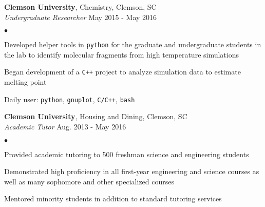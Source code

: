 \documentclass[margin, line]{res}
\newenvironment{list2}{
	\begin{list}{$\bullet$}{%
		\setlength{\itemsep}{0in}
		\setlength{\parsep}{0in} \setlength{\parskip}{0in}
		\setlength{\topsep}{0in} \setlength{\partopsep}{0in}
		\setlength{\leftmargin}{0.2in}}}{\end{list}}
\begin{document}
\begin{resume}
{\bf {Clemson University}}, Chemistry, Clemson, SC \\
\vspace{-.3cm}
{\em Undergraduate Researcher}
	\hfill{May 2015 - May 2016}\\

\begin{list2}
\item Developed helper tools in \verb|python| for the graduate and undergraduate students in the lab to identify molecular fragments from high temperature simulations
\item Began development of a \verb|C++| project to analyze simulation data to estimate melting point
\item Daily user: \verb|python|, \verb|gnuplot|, \verb|C/C++|, \verb|bash|
\end{list2}

{\bf {Clemson University}}, Housing and Dining, Clemson, SC \\
\vspace{-.3cm}
{\em Academic Tutor}
	\hfill{Aug. 2013 - May 2016}\\

\begin{list2}
\item Provided academic tutoring to 500 freshman science and engineering students
\item Demonstrated high proficiency in all first-year engineering and science courses as well as many sophomore and other specialized courses
\item Mentored minority students in addition to standard tutoring services
\end{list2}


\end{resume}
\end{document}
